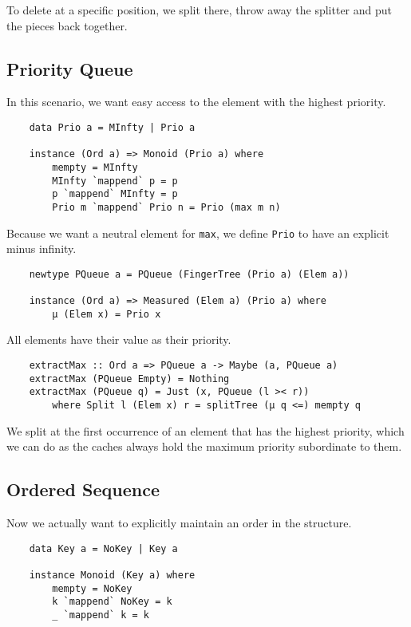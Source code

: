 To delete at a specific position, we split there, throw away the splitter and put the pieces back together.

\subsection{Priority Queue}

In this scenario, we want easy access to the element with the highest priority.

\begin{verbatim}
    data Prio a = MInfty | Prio a

    instance (Ord a) => Monoid (Prio a) where
        mempty = MInfty
        MInfty `mappend` p = p
        p `mappend` MInfty = p
        Prio m `mappend` Prio n = Prio (max m n)
\end{verbatim}

Because we want a neutral element for \texttt{max}, we define \texttt{Prio} to have an explicit minus infinity.

\begin{verbatim}
    newtype PQueue a = PQueue (FingerTree (Prio a) (Elem a))

    instance (Ord a) => Measured (Elem a) (Prio a) where
        μ (Elem x) = Prio x
\end{verbatim}

All elements have their value as their priority.

\begin{verbatim}
    extractMax :: Ord a => PQueue a -> Maybe (a, PQueue a)
    extractMax (PQueue Empty) = Nothing
    extractMax (PQueue q) = Just (x, PQueue (l >< r))
        where Split l (Elem x) r = splitTree (μ q <=) mempty q
\end{verbatim}

We split at the first occurrence of an element that has the highest priority, which we can do as the caches always hold the maximum priority subordinate to them.

\subsection{Ordered Sequence}

Now we actually want to explicitly maintain an order in the structure.

\begin{verbatim}
    data Key a = NoKey | Key a

    instance Monoid (Key a) where
        mempty = NoKey
        k `mappend` NoKey = k
        _ `mappend` k = k
\end{verbatim}

